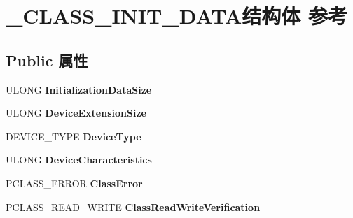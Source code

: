 \hypertarget{struct___c_l_a_s_s___i_n_i_t___d_a_t_a}{}\section{\+\_\+\+C\+L\+A\+S\+S\+\_\+\+I\+N\+I\+T\+\_\+\+D\+A\+T\+A结构体 参考}
\label{struct___c_l_a_s_s___i_n_i_t___d_a_t_a}
\subsection*{Public 属性}
\begin{DoxyCompactItemize}
\item 
\mbox{\label{struct___c_l_a_s_s___i_n_i_t___d_a_t_a_a130fafa4264561f2924031c3265b183c}} 
U\+L\+O\+NG {\bfseries Initialization\+Data\+Size}
\item 
\mbox{\label{struct___c_l_a_s_s___i_n_i_t___d_a_t_a_a6cc41528f93dc4bc0e35358768afb5c0}} 
U\+L\+O\+NG {\bfseries Device\+Extension\+Size}
\item 
\mbox{\label{struct___c_l_a_s_s___i_n_i_t___d_a_t_a_ae9cf9e45f44bcc0a6a74a1a4363de212}} 
D\+E\+V\+I\+C\+E\+\_\+\+T\+Y\+PE {\bfseries Device\+Type}
\item 
\mbox{\label{struct___c_l_a_s_s___i_n_i_t___d_a_t_a_ac3259ea066f8eedc0db954d9b976034c}} 
U\+L\+O\+NG {\bfseries Device\+Characteristics}
\item 
\mbox{\label{struct___c_l_a_s_s___i_n_i_t___d_a_t_a_a6ee4c2446d802b0d08391c8c2ed3e133}} 
P\+C\+L\+A\+S\+S\+\_\+\+E\+R\+R\+OR {\bfseries Class\+Error}
\item 
\mbox{\label{struct___c_l_a_s_s___i_n_i_t___d_a_t_a_aa089540341abb64274d1499688055e58}} 
P\+C\+L\+A\+S\+S\+\_\+\+R\+E\+A\+D\+\_\+\+W\+R\+I\+TE {\bfseries Class\+Read\+Write\+Verification}
\item 
\mbox{\label{struct___c_l_a_s_s___i_n_i_t___d_a_t_a_a3ba84259049cda475e0c6fa32d33f0cf}} 

\end{DoxyCompactItemize}
